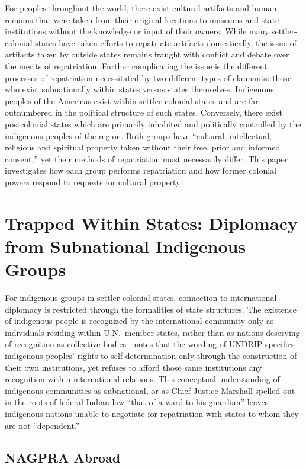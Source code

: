 \documentclass{../../../coursework}
\begin{document}
For peoples throughout the world, there exist cultural artifacts and human
remains that were taken from their original locations to museums and state
institutions without the knowledge or input of their owners. While many
settler-colonial states have taken efforts to repatriate artifacts
domestically, the issue of artifacts taken by outside states remains fraught
with conflict and debate over the merits of repatriation. Further complicating
the issue is the different processes of repatriation necessitated by two
different types of claimants: those who exist subnationally within states
versus states themselves. Indigenous peoples of the Americas exist within
settler-colonial states and are far outnumbered in the political structure of
such states. Conversely, there exist postcolonial states which are primarily
inhabited and politically controlled by the indigenous peoples of the region.
Both groups have ``cultural, intellectual, religious and spiritual property
taken without their free, prior and informed consent,'' yet their methods of
repatriation must necessarily differ. This paper investigates how each group
performs repatriation and how former colonial powers respond to requests for
cultural property.

\section{Trapped Within States: Diplomacy from Subnational Indigenous Groups}

For indigenous groups in settler-colonial states, connection to international
diplomacy is restricted through the formalities of state structures. The
existence of indigenous people is recognized by the international community
only as individuals residing within U.N.\ member states, rather than as
nations deserving of recognition as collective bodies \parencite{Sch12}.
\textcite{Car12} notes that the wording of UNDRIP specifies indigenous
peoples' rights to self-determination only through the construction of their
own institutions, yet refuses to afford those same institutions any
recognition within international relations. This conceptual understanding of
indigenous communities as subnational, or as Chief Justice Marshall spelled
out in the roots of federal Indian law ``that of a ward to his guardian''
\parencite[2]{The31} leaves indigenous nations unable to negotiate for
repatriation with states to whom they are not ``dependent.''

\subsection{NAGPRA Abroad}
\end{document}
